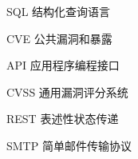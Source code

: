 \begin{denotation}[3cm]
\item[SQL] 结构化查询语言
\item[CVE] 公共漏洞和暴露
\item[API] 应用程序编程接口
\item[CVSS] 通用漏洞评分系统
\item[REST] 表述性状态传递
\item[SMTP] 简单邮件传输协议
\end{denotation}
